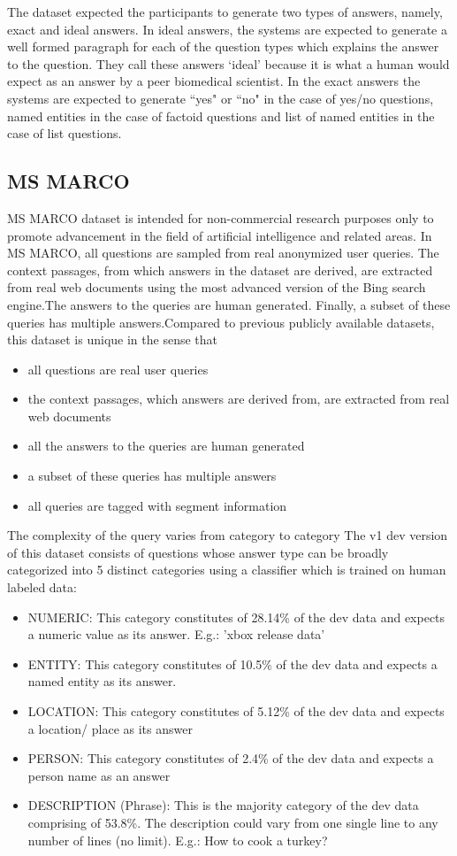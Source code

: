 The dataset expected the participants to generate two types of answers, namely, exact and ideal answers. In ideal answers, the systems are expected to generate a well formed paragraph for each of the question types which explains the answer to the question. They call these answers `ideal' because it is what a human would expect as an answer by a peer biomedical scientist. In the exact answers the systems are expected to generate ``yes" or ``no" in the case of yes/no questions, named entities in the case of factoid questions and list of named entities in the case of list questions.

\subsection{MS MARCO}
MS MARCO dataset is intended for non-commercial research purposes only to promote advancement in the field of artificial intelligence and related areas. In MS MARCO, all questions are sampled from real anonymized user queries. The context passages, from which answers in the dataset are derived, are extracted from real web documents using the most advanced version of the Bing search engine.The answers to the queries are human generated. Finally, a subset of these queries has multiple answers.Compared to previous publicly available datasets, this dataset is unique in the sense that
\begin{itemize}
    \item all questions are real user queries
    \item the context passages, which answers are derived from, are extracted from real web documents
    \item all the answers to the queries are human generated
    \item a subset of these queries has multiple answers
    \item all queries are tagged with segment information
\end{itemize}
The complexity of the query varies from category to category The v1 dev version of this dataset consists of questions whose answer type can be broadly categorized into 5 distinct categories using a classifier which is trained on human labeled data:
\begin{itemize}
    \item NUMERIC: This category constitutes of 28.14\% of the dev data and expects a numeric value as its answer. E.g.: 'xbox release data'
    \item ENTITY: This category constitutes of 10.5\% of the dev data and expects a named entity as its answer. 
    \item LOCATION: This category constitutes of 5.12\% of the dev data and expects a location/ place as its answer
    \item PERSON: This category constitutes of 2.4\% of the dev data and expects a person name as an answer
    \item DESCRIPTION (Phrase): This is the majority category of the dev data comprising of 53.8\%. The description could vary from one single line to any number of lines (no limit). E.g.: How to cook a turkey?
\end{itemize}